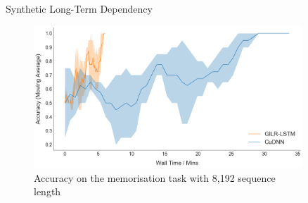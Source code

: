 \documentclass[final]{beamer}
\newlength{\sepwid}
\newlength{\onecolwid}
\newlength{\twocolwid}
\begin{document}
\begin{frame}[t]
\begin{columns}[t]
\begin{column}{\twocolwid}
\begin{columns}[t,totalwidth=\twocolwid]
\begin{column}{\onecolwid}
\begin{block}{Synthetic Long-Term Dependency}
 \vspace{2em}
\begin{figure}
\includegraphics[width=1.0\linewidth]{8k_for_poster.png}
\caption{Accuracy on the memorisation task with 8,192 sequence length}
\end{figure}

\end{block}





\end{column} %

\end{columns} %

\end{column} %

\begin{column}{\sepwid}\end{column} %

\begin{column}{\onecolwid} %


\end{column}
\end{columns}
\end{frame}
\end{document}
